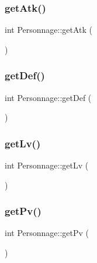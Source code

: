 \mbox{\label{classPersonnage_a929fa50e52b375c40455191d0d7f3fc9}} 
\subsubsection{\texorpdfstring{get\+Atk()}{getAtk()}}
{\footnotesize\ttfamily int Personnage\+::get\+Atk (\begin{DoxyParamCaption}{ }\end{DoxyParamCaption})}

\mbox{\label{classPersonnage_a2f3768b98bc5f21a5559c74826e4df16}} 
\subsubsection{\texorpdfstring{get\+Def()}{getDef()}}
{\footnotesize\ttfamily int Personnage\+::get\+Def (\begin{DoxyParamCaption}{ }\end{DoxyParamCaption})}

\mbox{\label{classPersonnage_af1534fd0d8549231464d4876f977d6b4}} 
\subsubsection{\texorpdfstring{get\+Lv()}{getLv()}}
{\footnotesize\ttfamily int Personnage\+::get\+Lv (\begin{DoxyParamCaption}{ }\end{DoxyParamCaption})}

\mbox{\label{classPersonnage_acfa390cc94bead3b08b00a55f016d2c3}} 
\subsubsection{\texorpdfstring{get\+Pv()}{getPv()}}
{\footnotesize\ttfamily int Personnage\+::get\+Pv (\begin{DoxyParamCaption}{ }\end{DoxyParamCaption})}

